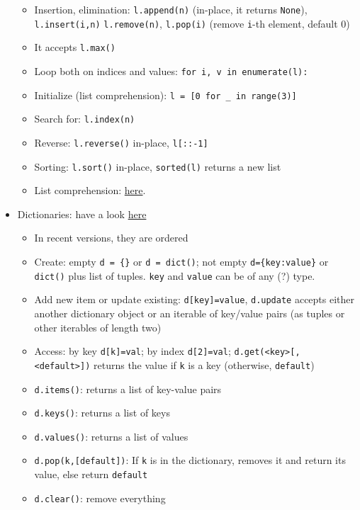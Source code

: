 \documentclass[a4paper,12pt,%
              final%
              ]{article}
\begin{document}
\begin{itemize}
\begin{itemize}
      \item Insertion, elimination: \verb|l.append(n)| (in-place, it returns \verb|None|), \verb|l.insert(i,n)| \verb|l.remove(n)|, \verb|l.pop(i)| (remove \texttt{i}-th element, default 0)
      \item It accepts \verb|l.max()|
      \item Loop both on indices and values: \verb|for i, v in enumerate(l):|
      \item Initialize (list comprehension): \verb|l = [0 for _ in range(3)]|
      \item Search for: \verb|l.index(n)|
      \item Reverse: \verb|l.reverse()| in-place, \verb|l[::-1]|
      \item Sorting: \verb|l.sort()| in-place, \verb|sorted(l)| returns a new list
      \item List comprehension: \href{https://www.programiz.com/python-programming/list-comprehension}{here}.
    \end{itemize}
  \item Dictionaries: have a look \href{https://realpython.com/python-dicts/}{here}
    \begin{itemize}
      \item In recent versions, they are ordered
      \item Create: empty \verb|d = {}| or \verb|d = dict()|; not empty \verb|d={key:value}| or \verb|dict()| plus list of tuples. \verb|key| and \verb|value| can be of any (?) type.
      \item Add new item or update existing: \verb|d[key]=value|, \verb|d.update| accepts either another dictionary object or an iterable of key/value pairs (as tuples or other iterables of length two)
      \item Access: by key \verb|d[k]=val|; by index \verb|d[2]=val|; \verb|d.get(<key>[, <default>])| returns the value if \texttt{k} is a key (otherwise, \texttt{default})
      \item \verb|d.items()|: returns a list of key-value pairs
      \item \verb|d.keys()|: returns a list of keys
      \item \verb|d.values()|: returns a list of values
      \item \verb|d.pop(k,[default])|: If \texttt{k} is in the dictionary, removes it and return its value, else return \texttt{default}
      \item \verb|d.clear()|: remove everything
    \end{itemize}

\end{itemize}
\end{document}
